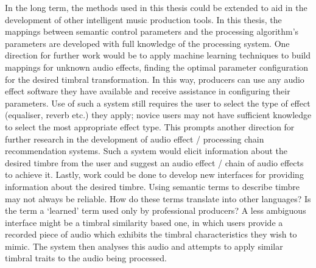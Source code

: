 	In the long term, the methods used in this thesis could be extended to aid in the development of other intelligent
	music production tools. In this thesis, the mappings between semantic control parameters and the processing
	algorithm's parameters are developed with full knowledge of the processing system. One direction for further work
	would be to apply machine learning techniques to build mappings for unknown audio effects, finding the optimal
	parameter configuration for the desired timbral transformation. In this way, producers can use any audio effect
	software they have available and receive assistance in configuring their parameters. Use of such a system still
	requires the user to select the type of effect (equaliser, reverb etc.) they apply; novice users may not have
	sufficient knowledge to select the most appropriate effect type. This prompts another direction for further research
	in the development of audio effect / processing chain recommendation systems. Such a system would elicit information
	about the desired timbre from the user and suggest an audio effect / chain of audio effects to achieve it. Lastly,
	work could be done to develop new interfaces for providing information about the desired timbre. Using semantic
	terms to describe timbre may not always be reliable. How do these terms translate into other languages? Is the term
	a `learned' term used only by professional producers? A less ambiguous interface might be a timbral similarity based
	one, in which users provide a recorded piece of audio which exhibits the timbral characteristics they wish to mimic.
	The system then analyses this audio and attempts to apply similar timbral traits to the audio being processed.
